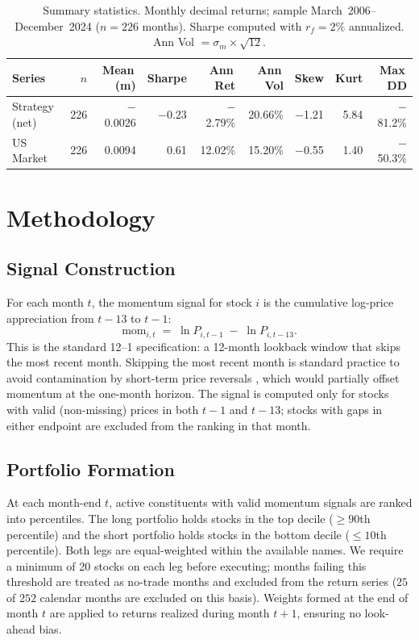 \documentclass[11pt]{article}
\begin{document}
\begin{table}[!ht]
\centering
\caption{Summary statistics. Monthly decimal returns; sample March~2006--December~2024
         ($n = 226$ months). Sharpe computed with $r_f = 2\%$ annualized.
         Ann Vol $= \sigma_m \times \sqrt{12}$.}
\label{tab:summary}
\begin{tabular}{lrrrrrrrr}
\toprule
Series & $n$ & Mean\,(m) & Sharpe & Ann\,Ret & Ann\,Vol & Skew & Kurt & Max\,DD \\
\midrule
Strategy (net) & 226 & $-$0.0026 & $-$0.23 & $-$2.79\% & 20.66\% & $-$1.21 & 5.84 & $-$81.2\% \\
US Market      & 226 & \phantom{$-$}0.0094 & \phantom{$-$}0.61 & \phantom{$-$}12.02\% & 15.20\% & $-$0.55 & 1.40 & $-$50.3\% \\
\bottomrule
\end{tabular}
\end{table}

\section{Methodology}
\label{sec:method}

\subsection{Signal Construction}

For each month $t$, the momentum signal for stock $i$ is the cumulative log-price
appreciation from $t{-}13$ to $t{-}1$:
\[
  \text{mom}_{i,t} \;=\; \ln P_{i,t-1} \;-\; \ln P_{i,t-13}.
\]
This is the standard 12--1 specification: a 12-month lookback window that skips the
most recent month. Skipping the most recent month is standard practice to avoid
contamination by short-term price reversals \citep{Jegadeesh1990}, which would partially
offset momentum at the one-month horizon. The signal is computed only for stocks with
valid (non-missing) prices in both $t{-}1$ and $t{-}13$; stocks with gaps in either
endpoint are excluded from the ranking in that month.

\subsection{Portfolio Formation}

At each month-end $t$, active constituents with valid momentum signals are ranked into
percentiles. The long portfolio holds stocks in the top decile ($\geq 90$th percentile)
and the short portfolio holds stocks in the bottom decile ($\leq 10$th percentile).
Both legs are equal-weighted within the available names. We require a minimum of 20
stocks on each leg before executing; months failing this threshold are treated as
no-trade months and excluded from the return series ($25$ of $252$ calendar months
are excluded on this basis). Weights formed at the end of month $t$ are applied to
returns realized during month $t{+}1$, ensuring no look-ahead bias.
\end{document}
